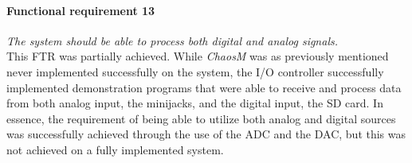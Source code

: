 \paragraph{Functional requirement 13}
\textit{The system should be able to process both digital and analog signals.}\\
This FTR was partially achieved. While \textit{ChaosM} was as previously mentioned never implemented successfully on the system, the I/O controller successfully implemented demonstration programs that were able to receive and process data from both analog input, the minijacks, and the digital input, the SD card.
In essence, the requirement of being able to utilize both analog and digital sources was successfully achieved through the use of the ADC and the DAC, but this was not achieved on a fully implemented system.



\clearpage


\clearpage

